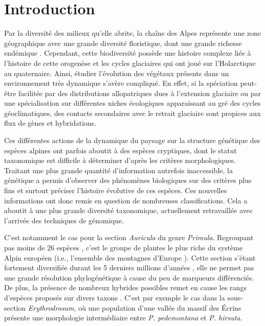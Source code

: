 \documentclass[../Master_report2.tex]{subfiles}
\begin{document}
\section{Introduction}

Par la diversité des milieux qu'elle abrite, la chaîne des Alpes représente une zone géographique avec une grande diversité floristique, dont une grande richesse endémique \citep{Ozenda1995}. Cependant, cette biodiversité possède une histoire complexe liée à l'histoire de cette orogenèse et les cycles glaciaires qui ont joué sur l'Holarctique au quaternaire. Ainsi, étudier l'évolution des végétaux présents dans un environnement très dynamique s'avère compliqué. En effet, si la spéciation peut-être facilitée par des distributions allopatriques dues à l’extension glaciaire ou par une spécialisation sur différentes niches écologiques apparaissant au gré des cycles géoclimatiques, des contacts secondaires avec le retrait glaciaire sont propices aux flux de gènes et hybridations. 

Ces différentes actions de la dynamique du paysage sur la structure génétique des espèces alpines ont parfois aboutit à des espèces cryptiques, dont le statut taxonomique est difficile à déterminer d'après les critères morphologiques. Traitant une plus grande quantité d'information autrefois inaccessible, la génétique a permis d'observer des phénomènes biologiques sur des critères plus fins et surtout préciser l'histoire évolutive de ces espèces. Ces nouvelles informations ont donc remis en question de nombreuses classifications. Cela a aboutit à une plus grande diversité taxonomique, actuellement retravaillée avec l'arrivée des techniques de génomique. 


C'est notamment le cas pour la section \textit{Auricula} du genre \textit{Primula}. Regroupant pas moins de 26 espèces \citep{Zhang2004}, c'est le groupe de plantes le plus riche du système Alpin européen (i.e., l'ensemble des montagnes d'Europe \citep{Ozenda1995}). Cette section s'étant fortement diversifiée durant les 5 derniers millions d'années \citep{Zhang2004a,Boucher2016}, elle ne permet pas une grande résolution phylogénétique à cause du peu de marqueurs différenciés. De plus, la présence de nombreux hybrides possibles remet en cause les rangs d'espèces proposés sur divers taxons \citep{Kadereit2011}. C'est par exemple le cas dans la sous-section \textit{Erythrodrosum}, où une population d'une vallée du massif des Écrins présente une morphologie intermédiaire entre \textit{P. pedemontana} et \textit{P. hirsuta}. 
\end{document}
